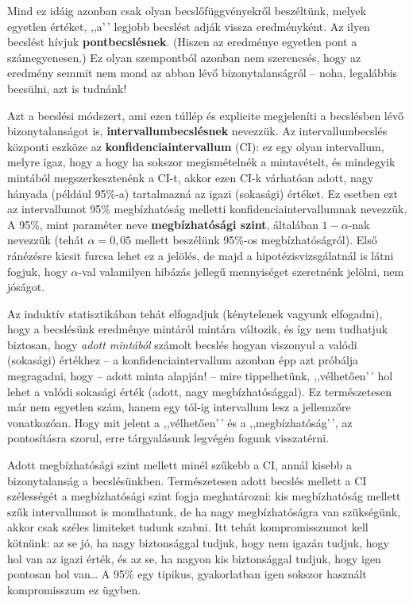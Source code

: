 \documentclass[
]{book}
\begin{document}
Mind ez idáig azonban csak olyan becslőfüggvényekről beszéltünk, melyek egyetlen értéket, ,,a'\,' legjobb becslést adják vissza eredményként. Az ilyen becslést hívjuk \textbf{pontbecslésnek}. (Hiszen az eredménye egyetlen pont a számegyenesen.) Ez olyan szempontból azonban nem szerencsés, hogy az eredmény semmit nem mond az abban lévő bizonytalanságról -- noha, legalábbis becsülni, azt is tudnánk!

Azt a becslési módszert, ami ezen túllép és explicite megjeleníti a becslésben lévő bizonytalanságot is, \textbf{intervallumbecslésnek} nevezzük. Az intervallumbecslés központi eszköze az \textbf{konfidenciaintervallum} (CI): ez egy olyan intervallum, melyre igaz, hogy a hogy ha sokszor megismételnék a mintavételt, és mindegyik mintából megszerkesztenénk a CI-t, akkor ezen CI-k várhatóan adott, nagy hányada (például 95\%-a) tartalmazná az igazi (sokasági) értéket. Ez esetben ezt az intervallumot 95\% megbízhatóság melletti konfidenciaintervallumnak nevezzük. A 95\%, mint paraméter neve \textbf{megbízhatósági szint}, általában \(1-\alpha\)-nak nevezzük (tehát \(\alpha=0,\!05\) mellett beszélünk 95\%-os megbízhatóságról). Első ránézésre kicsit furcsa lehet ez a jelölés, de majd a hipotézisvizsgálatnál is látni fogjuk, hogy \(\alpha\)-val valamilyen hibázás jellegű mennyiséget szeretnénk jelölni, nem jóságot.

Az induktív statisztikában tehát elfogadjuk (kénytelenek vagyunk elfogadni), hogy a becslésünk eredménye mintáról mintára változik, és így nem tudhatjuk biztosan, hogy \emph{adott mintából} számolt becslés hogyan viszonyul a valódi (sokasági) értékhez -- a konfidenciaintervallum azonban épp azt próbálja megragadni, hogy -- adott minta alapján! -- mire tippelhetünk, ,,vélhetően'\,' hol lehet a valódi sokasági érték (adott, nagy megbízhatósággal). Ez természetesen már nem egyetlen szám, hanem egy tól-ig intervallum lesz a jellemzőre vonatkozóan. Hogy mit jelent a ,,vélhetően'\,' és a ,,megbízhatóság'\,', az pontosításra szorul, erre tárgyalásunk legvégén fogunk visszatérni.

Adott megbízhatósági szint mellett minél szűkebb a CI, annál kisebb a bizonytalanság a becslésünkben. Természetesen adott becslés mellett a CI szélességét a megbízhatósági szint fogja meghatározni: kis megbízhatóság mellett szűk intervallumot is mondhatunk, de ha nagy megbízhatóságra van szükségünk, akkor csak széles limiteket tudunk szabni. Itt tehát kompromisszumot kell kötnünk: az se jó, ha nagy biztonsággal tudjuk, hogy nem igazán tudjuk, hogy hol van az igazi érték, és az se, ha nagyon kis biztonsággal tudjuk, hogy igen pontosan hol van\dots{} A 95\% egy tipikus, gyakorlatban igen sokszor használt kompromisszum ez ügyben.
\end{document}
